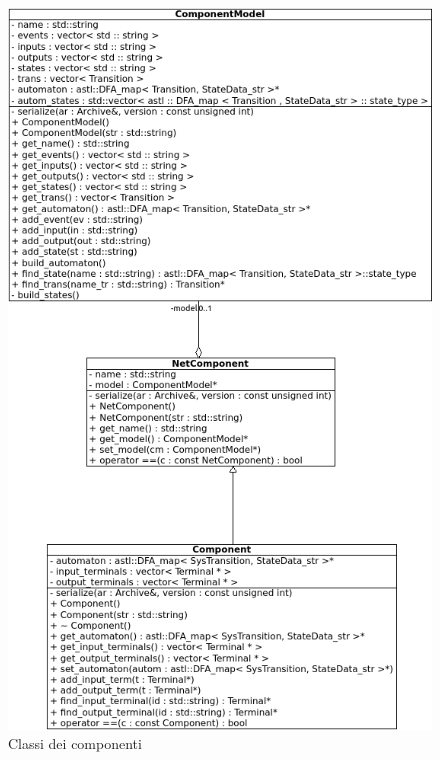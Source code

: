 \begin{figure}[htbp]
\centering
\includegraphics[scale=0.6]{./Img/implementazione/comp.png}
\caption{Classi dei componenti}
\label{fig:comp}
\end{figure}

